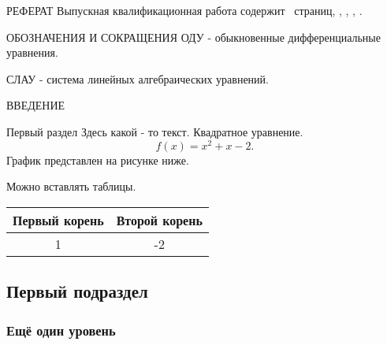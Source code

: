 \documentclass[14pt, a4paper, oneside, final]{extarticle}
\begin{document}
\begin{gostabstract}{РЕФЕРАТ}
Выпускная квалификационная работа содержит \pageref*{LastPage}~страниц, \printtotfig, \printtottab, \printtotapp, \printtotref .
\end{gostabstract}


\gosttableofcontents


\begin{lofab}{ОБОЗНАЧЕНИЯ И СОКРАЩЕНИЯ}
ОДУ - обыкновенные дифференциальные уравнения.

СЛАУ - система линейных алгебраических уравнений.
\end{lofab}


\begin{gostheader}{ВВЕДЕНИЕ}
\end{gostheader}


\mainpart


\begin{gostsection}{Первый раздел}
Здесь какой - то текст. Квадратное уравнение.
\begin{equation}
f(x) = x^2 + x-2.
\end{equation}
График представлен на рисунке ниже.
\begin{gostfigure}
\begin{center} 
\end{center}
\end{gostfigure}

Можно вставлять таблицы.
\begin{gosttable}
\begin{center} 
\begin{tabular}{|c|c|}
\hline 
Первый корень &  Второй корень \\ 
\hline 
1 & -2  \\ 
\hline 
\end{tabular} 
\end{center}
\end{gosttable}


\subsection{Первый подраздел}

\subsubsection{Ещё один уровень}

\end{gostsection}
\end{document}
